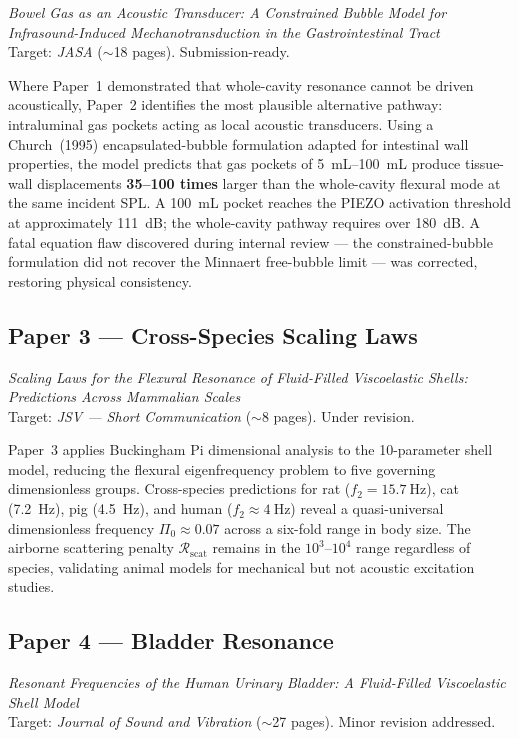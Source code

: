\documentclass[11pt,a4paper]{article}
\begin{document}
\emph{Bowel Gas as an Acoustic Transducer: A Constrained Bubble Model for Infrasound-Induced Mechanotransduction in the Gastrointestinal Tract}\\
Target: \emph{JASA} ($\sim$18 pages). Submission-ready.

Where Paper~1 demonstrated that whole-cavity resonance cannot be driven acoustically, Paper~2 identifies the most plausible alternative pathway: intraluminal gas pockets acting as local acoustic transducers. Using a Church~(1995) encapsulated-bubble formulation adapted for intestinal wall properties, the model predicts that gas pockets of \SIrange{5}{100}{\mL} produce tissue-wall displacements \textbf{35--100 times} larger than the whole-cavity flexural mode at the same incident SPL. A \SI{100}{\mL} pocket reaches the PIEZO activation threshold at approximately \SI{111}{\dB}; the whole-cavity pathway requires over \SI{180}{\dB}. A fatal equation flaw discovered during internal review --- the constrained-bubble formulation did not recover the Minnaert free-bubble limit --- was corrected, restoring physical consistency.

\subsection{Paper 3 --- Cross-Species Scaling Laws}

\emph{Scaling Laws for the Flexural Resonance of Fluid-Filled Viscoelastic Shells: Predictions Across Mammalian Scales}\\
Target: \emph{JSV --- Short Communication} ($\sim$8 pages). Under revision.

Paper~3 applies Buckingham Pi dimensional analysis to the 10-parameter shell model, reducing the flexural eigenfrequency problem to five governing dimensionless groups. Cross-species predictions for rat ($f_2 = \SI{15.7}{\Hz}$), cat (\SI{7.2}{\Hz}), pig (\SI{4.5}{\Hz}), and human ($f_2 \approx \SI{4}{\Hz}$) reveal a quasi-universal dimensionless frequency $\Pi_0 \approx 0.07$ across a six-fold range in body size. The airborne scattering penalty $\mathcal{R}_\mathrm{scat}$ remains in the $10^3$--$10^4$ range regardless of species, validating animal models for mechanical but not acoustic excitation studies.

\subsection{Paper 4 --- Bladder Resonance}

\emph{Resonant Frequencies of the Human Urinary Bladder: A Fluid-Filled Viscoelastic Shell Model}\\
Target: \emph{Journal of Sound and Vibration} ($\sim$27 pages). Minor revision addressed.
\end{document}
